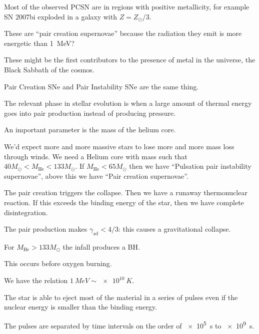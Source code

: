 \documentclass[main.tex]{subfiles}
\begin{document}
Most of the observed PCSN are in regions with positive metallicity, for example SN 2007bi exploded in a galaxy with \(Z = Z_{\odot} /3\). 

These are ``pair creation supernovae'' because the radiation they emit is more energetic than \SI{1}{MeV}? 

These might be the first contributors to the presence of metal in the universe, the Black Sabbath of the cosmos. 

Pair Creation SNe and Pair Instability SNe are the same thing. 

The relevant phase in stellar evolution is when a large amount of thermal energy goes into pair production instead of producing pressure. 

An important parameter is the mass of the helium core. 

We'd expect more and more massive stars to lose more and more mass loss through winds. 
We need a Helium core with mass such that \(40 M_{\odot} < M _{\text{He}} < 133 M_{\odot}\). If \(M _{\text{He}} < 65 M_{\odot}\) then we have ``Pulsation pair instability supernovae'', above this we have ``Pair creation supernovae''. 

The pair creation triggers the collapse. Then we have a runaway thermonuclear reaction. If this exceeds the binding energy of the star, then we have complete disintegration. 


The pair production makes \(\gamma _{\text{ad}} < 4/3\): this causes a gravitational collapse. 

For \(M _{\text{He}} > 133 M_{\odot}\) the infall produces a BH.

This occurs before oxygen burning. 

We have the relation \(\SI{1}{MeV} \sim \SI{e10}{K}\). 

The star is able to eject most of the material in a series of pulses even if the nuclear energy is smaller than the binding energy. 

The pulses are separated by time intervals on the order of \SI{e5}{s} to \SI{e9}{s}.  
\end{document}
